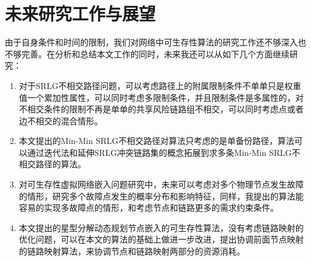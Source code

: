 \section{未来研究工作与展望}
由于自身条件和时间的限制，我们对网络中可生存性算法的研究工作还不够深入也不够完善。在分析和总结本文工作的同时，未来我还可以从如下几个方面继续研究：
\begin{enumerate}
  \item 对于SRLG不相交路径问题，可以考虑路径上的附属限制条件不单单只是权重值一个累加性属性，可以同时考虑多限制条件，并且限制条件是多属性的，对不相交条件的限制不再是单单的共享风险链路组不相交，可以同时考虑点或者边不相交的混合情形。
  \item 本文提出的Min-Min SRLG不相交路径对算法只考虑的是单备份路径，算法可以通过迭代法和延伸SRLG冲突链路集的概念拓展到求多条Min-Min SRLG不相交路径的算法。
  \item 对可生存性虚拟网络嵌入问题研究中，未来可以考虑对多个物理节点发生故障的情形，研究多个故障点发生的概率分布和影响特征，同样，我提出的算法能容易的实现多故障点的情形，和考虑节点和链路更多的需求约束条件。
  \item 本文提出的星型分解动态规划节点嵌入的可生存性算法，没有考虑链路映射的优化问题，可以在本文的算法的基础上做进一步改进，提出协调前面节点映射的链路映射算法，来协调节点和链路映射两部分的资源消耗。
\end{enumerate}

